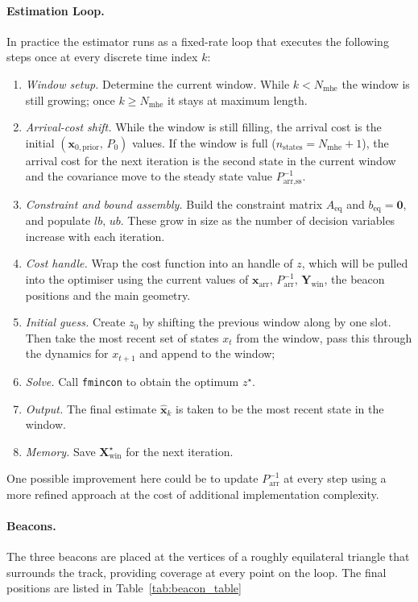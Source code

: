 \paragraph{Estimation Loop.}
In practice the estimator runs as a fixed-rate loop that executes the following steps once at every discrete time index $k$:

\begin{enumerate}
    \item \emph{Window setup.} Determine the current window. While $k < N_{\text{mhe}}$ the window is still growing; once $k \geq N_{\text{mhe}}$ it stays at maximum length.
    \item \emph{Arrival-cost shift.} While the window is still filling, the arrival cost is the initial $(\mathbf{x}_{0,\text{prior}},\,P_{0})$ values. If the window is full ($n_{\text{states}} = N_{\text{mhe}}+1$), the arrival cost for the next iteration is the second state in the current window and the covariance move to the steady state value $P_{\text{arr,ss}}^{-1}$. 
    \item \emph{Constraint and bound assembly.} Build the constraint matrix $A_{\text{eq}}$ and $b_{\text{eq}}=\mathbf{0}$, and populate $lb,\, ub$. These grow in size as the number of decision variables increase with each iteration. 
    \item \emph{Cost handle.} Wrap the cost function into an handle of $z$, which will be pulled into the optimiser using the current values of $\mathbf{x}_{\text{arr}}$, $P_{\text{arr}}^{-1}$, $\mathbf{Y}_{\text{win}}$, the beacon positions and the main geometry.
    \item \emph{Initial guess.} Create $z_{0}$ by shifting the previous window along by one slot. Then take the most recent set of states $x_t$ from the window, pass this through the dynamics for $x_{t+1}$ and append to the window;
    \item \emph{Solve.} Call \texttt{fmincon} to obtain the optimum $z^{\star}$.
    \item \emph{Output.} The final estimate $\widehat{\mathbf{x}}_{k}$ is taken to be the most recent state in the window.
    \item \emph{Memory.} Save $\mathbf{X}_{\text{win}}^{\star}$ for the next iteration.
\end{enumerate}
One possible improvement here could be to update $P_{\text{arr}}^{-1}$ at every step using a more refined approach at the cost of additional implementation complexity.

\paragraph{Beacons.}
The three beacons are placed at the vertices of a roughly equilateral triangle that surrounds the track, providing coverage at every point on the loop. The final positions are listed in Table~\ref{tab:beacon_table}

